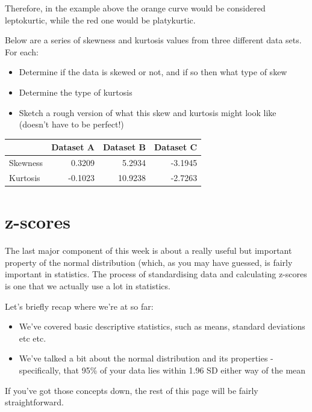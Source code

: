 \documentclass[
]{book}
\providecommand{\tightlist}{%
  \setlength{\itemsep}{0pt}\setlength{\parskip}{0pt}}
\begin{document}
Therefore, in the example above the orange curve would be considered leptokurtic, while the red one would be platykurtic.

Below are a series of skewness and kurtosis values from three different data sets. For each:

\begin{itemize}
\tightlist
\item
  Determine if the data is skewed or not, and if so then what type of skew
\item
  Determine the type of kurtosis
\item
  Sketch a rough version of what this skew and kurtosis might look like (doesn't have to be perfect!)
\end{itemize}

\begin{tabular}{l|r|r|r}
\hline
 & Dataset A & Dataset B & Dataset C\\
\hline
Skewness & 0.3209 & 5.2934 & -3.1945\\
\hline
Kurtosis & -0.1023 & 10.9238 & -2.7263\\
\hline
\end{tabular}

\hypertarget{z-scores}{%
\section{z-scores}\label{z-scores}}

The last major component of this week is about a really useful but important property of the normal distribution (which, as you may have guessed, is fairly important in statistics. The process of standardising data and calculating z-scores is one that we actually use a lot in statistics.

\newline

Let's briefly recap where we're at so far:

\begin{itemize}
\tightlist
\item
  We've covered basic descriptive statistics, such as means, standard deviations etc etc.
\item
  We've talked a bit about the normal distribution and its properties - specifically, that 95\% of your data lies within 1.96 SD either way of the mean
\end{itemize}

If you've got those concepts down, the rest of this page will be fairly straightforward.
\end{document}
